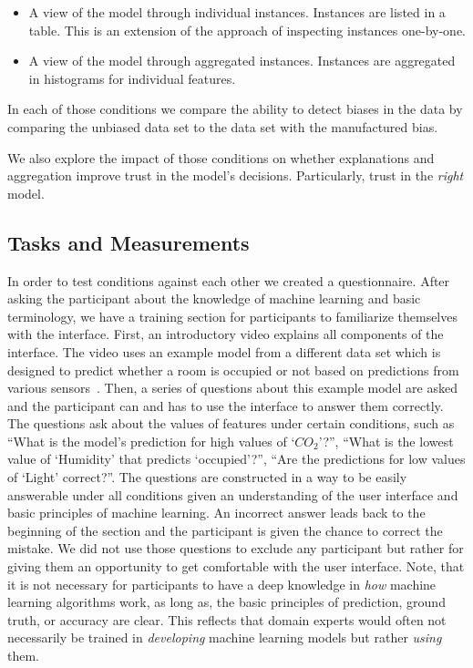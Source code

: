 \begin{itemize}
	\item
    A view of the model through individual instances.
    Instances are listed in a table.
    This is an extension of the approach of inspecting instances one-by-one.
    \item
    A view of the model through aggregated instances.
    Instances are aggregated in histograms for individual features.
\end{itemize}

In each of those conditions we compare the ability to detect biases in the data by comparing the unbiased data set to the data set with the manufactured bias.

We also explore the impact of those conditions on whether explanations and aggregation improve trust in the model's decisions.
Particularly, trust in the \emph{right} model.

\subsection{Tasks and Measurements}
In order to test conditions against each other we created a questionnaire.
After asking the participant about the knowledge of machine learning and basic terminology, we have a training section for participants to familiarize themselves with the interface.
First, an introductory video explains all components of the interface.
The video uses an example model from a different data set which is designed to predict whether a room is occupied or not based on predictions from various sensors~\cite{occupancy}.
Then, a series of questions about this example model are asked and the participant can and has to use the interface to answer them correctly.
The questions ask about the values of features under certain conditions, such as ``What is the model's prediction for high values of `$CO_2$'?'', ``What is the lowest value of `Humidity' that predicts `occupied'?'', ``Are the predictions for low values of `Light' correct?''.
The questions are constructed in a way to be easily answerable under all conditions given an understanding of the user interface and basic principles of machine learning.
An incorrect answer leads back to the beginning of the section and the participant is given the chance to correct the mistake.
We did not use those questions to exclude any participant but rather for giving them an opportunity to get comfortable with the user interface.
Note, that it is not necessary for participants to have a deep knowledge in \emph{how} machine learning algorithms work, as long as, the basic principles of prediction, ground truth, or accuracy are clear.  This reflects that domain experts would often not necessarily be trained in \emph{developing} machine learning models but rather \emph{using} them.

